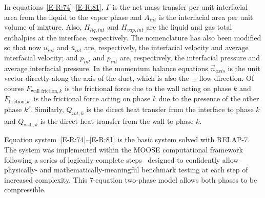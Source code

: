 In equations~\eqref{E-R:74}--\eqref{E-R:81}, $\Gamma$ is the net mass transfer per unit
interfacial area from the liquid to the vapor phase and $A_{int}$ is
the interfacial area per unit volume of mixture.  Also, $H_{liq, int}$
and $H_{vap, int}$ are the liquid and gas total enthalpies at the
interface, respectively.  The nomenclature has also been modified so
that now $u_{int}$ and $\bar{u}_{int}$ are, respectively, the
interfacial velocity and average interfacial velocity; and $p_{int}$
and $\bar{p}_{int}$ are, respectively, the interfacial pressure and
average interfacial pressure.  In the momentum balance equations
$\vec{n}_{axis}$ is the unit vector directly along the axis of the
duct, which is also the $\pm$ flow direction.  Of course
$F_{\text{wall friction}, k}$ is the frictional force due to the wall acting on phase
$k$ and $F_{\text{friction}, k'}$ is the frictional force acting on
phase $k$ due to the presence of the other phase $k'$.
Similarly, $Q_{int, k}$ is the direct heat transfer from the interface
to phase $k$ and $Q_{\text{wall}, k}$ is the direct heat transfer from
the wall to phase $k$.

Equation system~\eqref{E-R:74}--\eqref{E-R:81} is the basic system
solved with RELAP-7.  The system was implemented within the MOOSE
computational framework following a series of logically-complete
steps~\cite{Berry_2013} designed to confidently allow physically- and
mathematically-meaningful benchmark testing at each step of increased
complexity.  This 7-equation two-phase model allows both phases to be
compressible.
